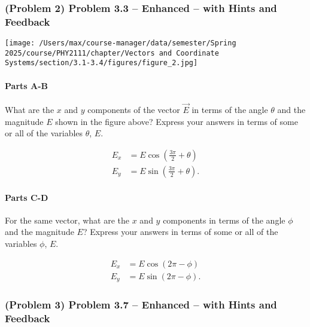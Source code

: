 \newpage

\subsubsection{(Problem 2) Problem 3.3 -- Enhanced -- with Hints and Feedback}

\begin{center}
	\texttt{[image: /Users/max/course-manager/data/semester/Spring 2025/course/PHY2111/chapter/Vectors and Coordinate Systems/section/3.1-3.4/figures/figure\_2.jpg]}
\end{center}

\setcounter{partcounter}{2}
\paragraph{Parts A-B}

What are the $x$ and $y$ components of the vector $\vec{E}$ in terms of the angle $\theta$ and the magnitude $E$ shown in the figure above? Express your answers in terms of some or all of the variables $\theta$, $E$.

\begin{solution}
	\begin{align*}
		E_{x} &= E \cos \left( \frac{3\pi}{2} + \theta \right) \\
		E_{y} &= E \sin \left( \frac{3\pi}{2} + \theta \right)
		.\end{align*}
\end{solution}

\setcounter{partcounter}{4}
\paragraph{Parts C-D}

For the same vector, what are the $x$ and $y$ components in terms of the angle $\phi$ and the magnitude $E$?
Express your answers in terms of some or all of the variables $\phi$, $E$.

\begin{solution}
	\begin{align*}
		E_{x} &= E \cos \left( 2\pi - \phi \right) \\
		E_{y} &= E \sin \left( 2\pi - \phi \right)
		.\end{align*}
\end{solution}

\newpage

\subsubsection{(Problem 3) Problem 3.7 -- Enhanced -- with Hints and Feedback}

